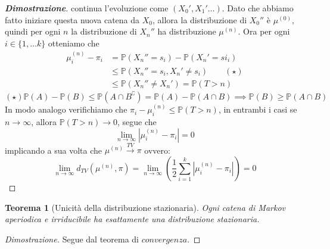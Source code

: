 \documentclass{article}
\newtheorem{theorem}{Teorema}[section]
\theoremstyle{definition}
\theoremstyle{definition}
\theoremstyle{remark}
\begin{document}
\begin{proof}[\textbf{Dimostrazione}]
    continua l'evoluzione come $(X_0',X_1'\dots)$. Dato che abbiamo fatto iniziare questa nuova catena da $X_0$, allora la distribuzione di $X_0''$ è $\mu^{(0)}$, quindi per ogni $n$ la distribuzione di $X_n''$ ha distribuzione $\mu^{(n)}$.
    Ora per ogni $i\in\{1,\dots k\}$ otteniamo che
    \begin{align*}
        \mu^{(n)}_i - \pi_i & = \mathbb{P}(X_n'' = s_i) -\mathbb{P}(X_n' = si_i)          \\
                            & \le \mathbb{P}(X_n'' = s_i, X_n' \neq s_i)   \qquad (\star) \\
                            & \le \mathbb{P}(X_n'' \neq X_n')  = \mathbb{P}(T>n)
    \end{align*}
    $(\star)\mathbb{P}(A)-\mathbb{P}(B)\le \mathbb{P}(A\cap B^{\complement}) = \mathbb{P}(A)-\mathbb{P}(A\cap B) \implies \mathbb{P}(B)\ge \mathbb{P}(A\cap B)$\\

    In modo analogo verifichiamo che $\pi_i - \mu^{(n)}_i \le \mathbb{P}(T>n)$, in entrambi i casi se $n\to\infty$, allora $\mathbb{P}(T>n)\to 0$, segue che
    $$\lim_{n\to \infty}|\mu_i^{(n)}-\pi_i| = 0$$
    implicando a sua volta che $\mu^{(n)}\xrightarrow{TV}\pi$ ovvero:
    $$\lim_{n\to\infty}d_{TV}(\mu^{(n)},\pi) = \lim_{n\to\infty}\left(\frac{1}{2}\sum_{i = 1}^k |\mu_i^{(n)}-\pi_i|\right)  = 0$$
\end{proof}
\begin{theorem}[Unicità della distribuzione stazionaria]
    Ogni catena di Markov aperiodica e irriducibile ha esattamente una distribuzione stazionaria.
\end{theorem}
\begin{proof}[Dimostrazione] Segue dal teorema di $convergenza$.

\end{proof}
\end{document}
